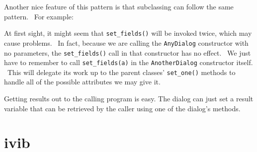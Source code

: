 Another nice feature of this pattern is that subclassing can follow the
same pattern. \ For example:


At first sight, it might seem that \texttt{set\_fields()} will be
invoked twice, which may cause problems. \ In fact, because we are
calling the \texttt{AnyDialog} constructor with no parameters, the
\texttt{set\_fields()} call in that constructor has no effect. \ We
just have to remember to call \texttt{set\_fields(a)} in the
\texttt{AnotherDialog} constructor itself. \ This will delegate its
work up to the parent classes' \texttt{set\_one()}
methods to handle all of the possible attributes we may give it.

Getting results out to the calling program is easy. The dialog
can just set a result variable that can be retrieved by
the caller using one of the dialog's methods.

\section{\textsf{ivib}}

